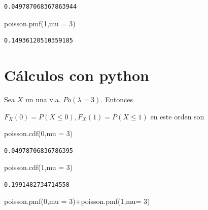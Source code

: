 \documentclass[
  letterpaper,
  DIV=11,
  numbers=noendperiod]{scrreprt}
\newenvironment{Shaded}{\begin{snugshade}}{\end{snugshade}}
\newcommand{\DecValTok}[1]{\textcolor[rgb]{0.68,0.00,0.00}{#1}}
\newcommand{\NormalTok}[1]{\textcolor[rgb]{0.00,0.23,0.31}{#1}}
\newcommand{\OperatorTok}[1]{\textcolor[rgb]{0.37,0.37,0.37}{#1}}
\begin{document}
\begin{verbatim}
0.049787068367863944
\end{verbatim}

\begin{Shaded}
\begin{Highlighting}[]
\NormalTok{poisson.pmf(}\DecValTok{1}\NormalTok{,mu }\OperatorTok{=} \DecValTok{3}\NormalTok{)}
\end{Highlighting}
\end{Shaded}

\begin{verbatim}
0.14936120510359185
\end{verbatim}

\section{Cálculos con python}\label{cuxe1lculos-con-python-5}

Sea \(X\) un una v.a. \(Po(\lambda=3)\). Entonces

\(F_X(0)=P(X\leq 0), F_X(1)=P(X\leq 1)\) en este orden son

\begin{Shaded}
\begin{Highlighting}[]
\NormalTok{poisson.cdf(}\DecValTok{0}\NormalTok{,mu }\OperatorTok{=} \DecValTok{3}\NormalTok{)}
\end{Highlighting}
\end{Shaded}

\begin{verbatim}
0.04978706836786395
\end{verbatim}

\begin{Shaded}
\begin{Highlighting}[]
\NormalTok{poisson.cdf(}\DecValTok{1}\NormalTok{,mu }\OperatorTok{=} \DecValTok{3}\NormalTok{)}
\end{Highlighting}
\end{Shaded}

\begin{verbatim}
0.1991482734714558
\end{verbatim}

\begin{Shaded}
\begin{Highlighting}[]
\NormalTok{poisson.pmf(}\DecValTok{0}\NormalTok{,mu }\OperatorTok{=} \DecValTok{3}\NormalTok{)}\OperatorTok{+}\NormalTok{poisson.pmf(}\DecValTok{1}\NormalTok{,mu}\OperatorTok{=} \DecValTok{3}\NormalTok{) }
\end{Highlighting}
\end{Shaded}
\end{document}
